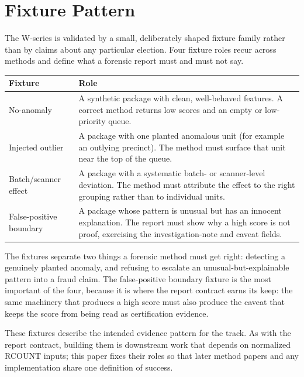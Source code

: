 \section{Fixture Pattern}

The W-series is validated by a small, deliberately shaped fixture family rather
than by claims about any particular election. Four fixture roles recur across
methods and define what a forensic report must and must not say.

\begin{center}
\small
\begin{tabularx}{\textwidth}{lX}
\toprule
Fixture & Role \\
\midrule
No-anomaly & A synthetic package with clean, well-behaved features. A correct method returns low scores and an empty or low-priority queue. \\
Injected outlier & A package with one planted anomalous unit (for example an outlying precinct). The method must surface that unit near the top of the queue. \\
Batch/scanner effect & A package with a systematic batch- or scanner-level deviation. The method must attribute the effect to the right grouping rather than to individual units. \\
False-positive boundary & A package whose pattern is unusual but has an innocent explanation. The report must show why a high score is not proof, exercising the investigation-note and caveat fields. \\
\bottomrule
\end{tabularx}
\end{center}

The fixtures separate two things a forensic method must get right: detecting a
genuinely planted anomaly, and refusing to escalate an unusual-but-explainable
pattern into a fraud claim. The false-positive boundary fixture is the most
important of the four, because it is where the report contract earns its keep:
the same machinery that produces a high score must also produce the caveat that
keeps the score from being read as certification evidence.

These fixtures describe the intended evidence pattern for the track. As with the
report contract, building them is downstream work that depends on normalized
RCOUNT inputs; this paper fixes their roles so that later method papers and any
implementation share one definition of success.
